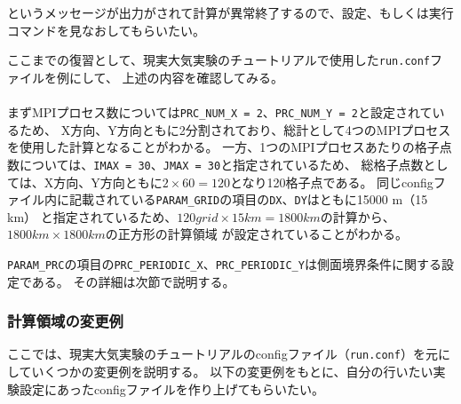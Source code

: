 \noindent というメッセージが出力がされて計算が異常終了するので、設定、もしくは実行コマンドを見なおしてもらいたい。

ここまでの復習として、現実大気実験のチュートリアルで使用した\verb|run.conf|ファイルを例にして、
上述の内容を確認してみる。\\

\\

\noindent まずMPIプロセス数については\verb|PRC_NUM_X = 2|、\verb|PRC_NUM_Y = 2|と設定されているため、
X方向、Y方向ともに2分割されており、総計として4つのMPIプロセスを使用した計算となることがわかる。
一方、1つのMPIプロセスあたりの格子点数については、\verb|IMAX = 30|、\verb|JMAX = 30|と指定されているため、
総格子点数としては、X方向、Y方向ともに$2 \times 60 = 120$となり120格子点である。
同じconfigファイル内に記載されている\verb|PARAM_GRID|の項目の\verb|DX|、\verb|DY|はともに15000 m（15 km）
と指定されているため、$120 grid \times 15 km = 1800 km$の計算から、$1800 km \times 1800 km$の正方形の計算領域
が設定されていることがわかる。

\verb|PARAM_PRC|の項目の\verb|PRC_PERIODIC_X|、\verb|PRC_PERIODIC_Y|は側面境界条件に関する設定である。
その詳細は次節で説明する。


\subsubsection{計算領域の変更例}
ここでは、現実大気実験のチュートリアルのconfigファイル（\verb|run.conf|）を元にしていくつかの変更例を説明する。
以下の変更例をもとに、自分の行いたい実験設定にあったconfigファイルを作り上げてもらいたい。\\


